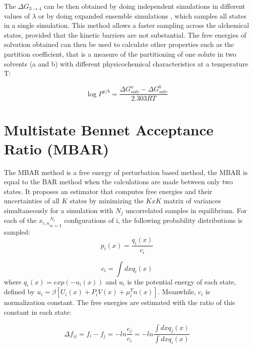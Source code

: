 	The $\Delta G_{3 \rightarrow 4}$ can be then obtained by doing independent simulations in different values of $\lambda$ or by doing expanded ensemble simulations \cite{lyubartsev}, which samples all states in a single simulation. This method allows a faster sampling across the alchemical states, provided that the kinetic barriers are not substantial. The free energies of solvation obtained can then be used to calculate other properties such as the partition coefficient, that is a measure of the partitioning of one solute in two solvents (a and b) with different physicochemical characteristics  at a temperature T:
	
	\begin{equation}
	\label{eqn:partcoe}
	\log{P}^{a/b} = \frac{\Delta G_{solv}^{a} - \Delta G_{solv}^{b}}{2.303RT}
	\end{equation}
	
	
	
\section{Multistate Bennet Acceptance Ratio (MBAR)}\label{mbar}
	
	The MBAR method is a free energy of perturbation based method, the MBAR is equal to the BAR method when the calculations are made between only two states. It proposes an estimator that computes free energies and their uncertainties of all $K$ states  by minimizing the $KxK$ matrix of variances simultaneously for a simulation with $N_{j}$ uncorrelated samples in equilibrium. For each of the ${x_{i,n}}_{n=1}^{N_{i}}$ configurations of i, the following probability distributions is sampled:
	\begin{equation}
	p_{i}(x) = \frac{q_{i}(x)}{c_{i}}
	\end{equation}
	
	\begin{equation}
	c_{i} = \int dx q_{i}(x)
	\end{equation}
	where $q_{i}(x)=exp(-u_{i}(x))$ and $u_{i}$ is the potential energy of each state, defined by $u_{i}= \beta [U_{i}(x)+P_{i}V(x) + \mu _{i}^{T}n(x)]$. Meanwhile, $c_{i}$ is normalization constant.  The free energies are estimated with the ratio of this constant in each state:
	
	\begin{equation}
	\Delta f_{ij} = f_{i} - f_{j} = - ln \frac{c_{j}}{c_{i}}  = -ln \frac{\int dx q_{j}(x)}{\int dx q_{i}(x)} 
	\end{equation}
	
